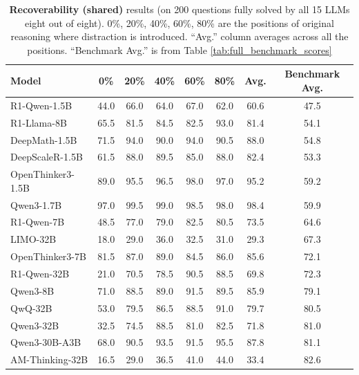 \documentclass{article} %
\begin{document}
\label{sec:appendix_recoverability_test}
\begin{table}[ht!]
  \centering
  \begin{tabular}{lcccccc|c}
    \toprule
    \textbf{Model} & \textbf{0\%} & \textbf{20\%} & \textbf{40\%} & \textbf{60\%} & \textbf{80\%} & \textbf{Avg.} & \textbf{Benchmark Avg.} \\
    \midrule
    R1-Qwen-1.5B    & 44.0 & 66.0 & 64.0 & 67.0 & 62.0 & 60.6 & 47.5 \\
    R1-Llama-8B             & 65.5 & 81.5 & 84.5 & 82.5 & 93.0 & 81.4 & 54.1 \\
    DeepMath-1.5B           & 71.5 & 94.0 & 90.0 & 94.0 & 90.5 & 88.0 & 54.8 \\
    DeepScaleR-1.5B         & 61.5 & 88.0 & 89.5 & 85.0 & 88.0 & 82.4 & 53.3 \\
    OpenThinker3-1.5B       & 89.0 & 95.5 & 96.5 & 98.0 & 97.0 & 95.2 & 59.2 \\
    Qwen3-1.7B              & 97.0 & 99.5 & 99.0 & 98.5 & 98.0 & 98.4 & 59.9 \\
    \midrule
    R1-Qwen-7B      & 48.5 & 77.0 & 79.0 & 82.5 & 80.5 & 73.5 & 64.6 \\
    LIMO-32B                & 18.0 & 29.0 & 36.0 & 32.5 & 31.0 & 29.3 & 67.3 \\
    OpenThinker3-7B         & 81.5 & 87.0 & 89.0 & 84.5 & 86.0 & 85.6 & 72.1 \\
    R1-Qwen-32B     & 21.0 & 70.5 & 78.5 & 90.5 & 88.5 & 69.8 & 72.3 \\
    \midrule
    Qwen3-8B                & 71.0 & 88.5 & 89.0 & 91.5 & 89.5 & 85.9 & 79.1 \\
    QwQ-32B                 & 53.0 & 79.5 & 86.5 & 88.5 & 91.0 & 79.7 & 80.5 \\
    Qwen3-32B               & 32.5 & 74.5 & 88.5 & 81.0 & 82.5 & 71.8 & 81.0 \\
    Qwen3-30B-A3B           & 68.0 & 90.5 & 93.5 & 91.5 & 95.5 & 87.8 & 81.1 \\
    AM-Thinking-32B      & 16.5 & 29.0 & 36.5 & 41.0 & 44.0  & 33.4 & 82.6 \\
    \bottomrule
  \end{tabular}
  \caption{\textbf{Recoverability (shared)} results (on 200 questions fully solved by all 15 LLMs eight out of eight). 0\%, 20\%, 40\%, 60\%, 80\% are the positions of original reasoning where distraction is introduced. ``Avg.'' column averages across all the positions. ``Benchmark Avg.'' is from Table \ref{tab:full_benchmark_scores}}
  \label{tab:recoverability_shared}
\end{table}
\end{document}
